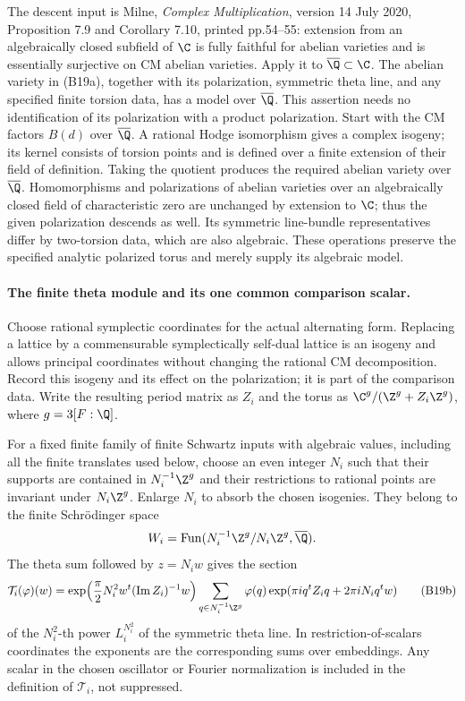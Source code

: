 The descent input is Milne, \emph{Complex Multiplication},
version 14 July 2020, Proposition 7.9 and Corollary 7.10,
printed pp.54--55: extension from an algebraically closed subfield
of $\C$ is fully faithful for abelian varieties and is essentially
surjective on CM abelian varieties.  Apply it to
$\overline\Q\subset\C$.  The abelian variety in (B19a), together with its polarization,
symmetric theta line, and any specified finite torsion data, has a
model over $\overline\Q$.  This assertion needs no identification
of its polarization with a product polarization.  Start with the
CM factors $B(d)$ over $\overline\Q$.  A rational Hodge
isomorphism gives a complex isogeny; its kernel consists of torsion
points and is defined over a finite extension of their field of
definition.  Taking the quotient produces the required abelian
variety over $\overline\Q$.  Homomorphisms and polarizations of
abelian varieties over an algebraically closed field of
characteristic zero are unchanged by extension to $\C$; thus the
given polarization descends as well.  Its symmetric line-bundle
representatives differ by two-torsion data, which are also
algebraic.  These operations preserve the specified analytic
polarized torus and merely supply its algebraic model.

\paragraph{The finite theta module and its one common comparison scalar.}
Choose rational symplectic coordinates for the actual alternating
form.  Replacing a lattice by a commensurable symplectically
self-dual lattice is an isogeny and allows principal coordinates
without changing the rational CM decomposition.  Record this
isogeny and its effect on the polarization; it is part of the
comparison data.  Write the resulting period matrix as $Z_i$ and
the torus as $\C^g/(\Z^g+Z_i\Z^g)$, where $g=3[F:\Q]$.

For a fixed finite family of finite Schwartz inputs with algebraic
values, including
all the finite translates used below, choose an even integer $N_i$
such that their supports are contained in $N_i^{-1}\Z^g$ and
their restrictions to rational points are invariant under
$N_i\Z^g$.  Enlarge $N_i$ to absorb the chosen isogenies.  They
belong to the finite Schr\"odinger space
\[
 W_i=\operatorname{Fun}
       (N_i^{-1}\Z^g/N_i\Z^g,\overline\Q).
\]
The theta sum followed by $z=N_iw$ gives the section
\[
 \mathcal T_i(\varphi)(w)=
 \exp\!\left(\frac\pi2N_i^2w^t
                       (\operatorname{Im}Z_i)^{-1}w\right)
 \sum_{q\in N_i^{-1}\Z^g}
    \varphi(q)\exp(\pi i q^tZ_iq+2\pi iN_iq^tw)
 \tag{B19b}
\]
of the $N_i^2$-th power $L_i^{N_i^2}$ of the symmetric theta
line.  In restriction-of-scalars coordinates the exponents are
the corresponding sums over embeddings.  Any scalar in the
chosen oscillator or Fourier normalization is included in the
definition of $\mathcal T_i$, not suppressed.

